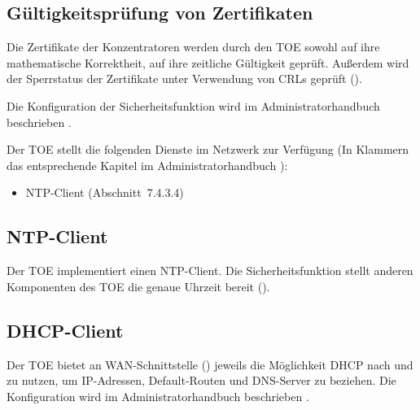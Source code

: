\subsection{Gültigkeitsprüfung von Zertifikaten}\label{sf.vpn.certverification}

Die Zertifikate der Konzentratoren werden durch den TOE sowohl auf ihre
mathematische Korrektheit, auf ihre zeitliche Gültigkeit geprüft. Außerdem wird
der Sperrstatus der Zertifikate unter Verwendung von CRLs geprüft
().




Die Konfiguration der Sicherheitsfunktion wird im Administratorhandbuch
beschrieben \autocite[Abschnitt~7.4]{agd_adm}.

\sfdescription{}

Der TOE stellt die folgenden Dienste im Netzwerk zur Verfügung (In Klammern das
entsprechende Kapitel im Administratorhandbuch \autocite{agd_adm}):

\begin{itemize}
\item NTP-Client (Abschnitt~7.4.3.4)
\end{itemize}

\hypertarget{sf.networkservices.ntp}{\subsection{NTP-Client}\label{sf.networkservices.ntp}}

Der TOE implementiert einen NTP-Client. Die Sicherheitsfunktion
 stellt anderen Komponenten des TOE
die genaue Uhrzeit bereit ().

\subsection{DHCP-Client}\label{sf.networkservices.dhcpclient}

Der TOE bietet an WAN-Schnittstelle (\lswandhcp{}) jeweils die Möglichkeit
DHCP nach  und  zu nutzen, um IP-Adressen,
Default-Routen und DNS-Server zu beziehen. Die Konfiguration wird im
Administratorhandbuch beschrieben \autocite{agd_adm}.



